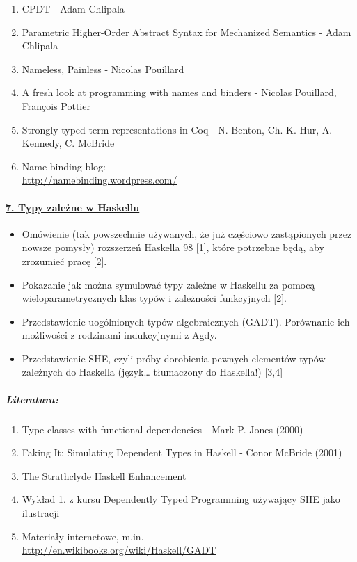 \documentclass[10pt, a4paper]{article}
\begin{document}
\begin{enumerate}
\addtolength{\itemsep}{-0.5\baselineskip}
 \item CPDT - Adam Chlipala
 \item Parametric Higher-Order Abstract Syntax for Mechanized Semantics - Adam Chlipala
 \item Nameless, Painless - Nicolas Pouillard
 \item A fresh look at programming with names and binders - Nicolas Pouillard, François Pottier
 \item Strongly-typed term representations in Coq - N. Benton, Ch.-K. Hur, A. Kennedy, C. McBride
 \item Name binding blog: \\
       \url{http://namebinding.wordpress.com/}
\end{enumerate}

\paragraph{\underline{7. Typy zależne w Haskellu}}

\begin{itemize}
\addtolength{\itemsep}{-0.5\baselineskip}
 \item Omówienie (tak powszechnie używanych, że już częściowo zastąpionych przez nowsze pomysły) rozszerzeń Haskella 98 [1], które potrzebne będą, aby zrozumieć pracę [2].
 \item Pokazanie jak można symulować typy zależne w Haskellu za pomocą wieloparametrycznych klas typów i zależności funkcyjnych [2].
 \item Przedstawienie uogólnionych typów algebraicznych (GADT). Porównanie ich możliwości z rodzinami indukcyjnymi z Agdy.
 \item Przedstawienie SHE, czyli próby dorobienia pewnych elementów typów zależnych do Haskella (język… tłumaczony do Haskella!) [3,4]
\end{itemize}

\subparagraph{Literatura:}

\begin{enumerate}
\addtolength{\itemsep}{-0.5\baselineskip}

 \item Type classes with functional dependencies - Mark P. Jones (2000)
 \item Faking It: Simulating Dependent Types in Haskell - Conor McBride (2001) 
 \item The Strathclyde Haskell Enhancement
 \item Wykład 1. z kursu Dependently Typed Programming używający SHE jako ilustracji
 \item Materiały internetowe, m.in. \\
       \url{http://en.wikibooks.org/wiki/Haskell/GADT}

\end{enumerate}
\end{document}
